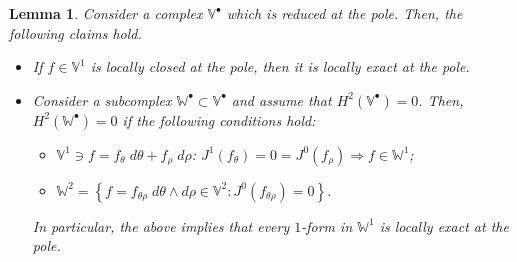 \documentclass[10pt]{article}
\newcommand{\vSpace}[1]{\mathbb{#1}}
\newcommand{\complex}[1]{\mathit{\vSpace{#1}^\bullet}}
\newcommand{\cU}{\theta}
\newcommand{\cV}{\rho}
\newcommand{\dcU}{\mathit{d\cU}}
\newcommand{\dcV}{\mathit{d\cV}}
\newcommand{\jet}[2]{J^{#1}\left(#2\right)}
\theoremstyle{plain}
\newtheorem{lemma}{Lemma}[section]
\theoremstyle{definition}
\theoremstyle{remark}
\begin{document}
\begin{lemma}\label{lem:reduced-complex}
    Consider a complex $\complex{V}$ which is reduced at the pole.
    Then, the following claims hold.
    \begin{itemize}
        \item If $f \in \vSpace{V}^1$ is locally closed at the pole, then it is locally exact at the pole.
        \item Consider a subcomplex $\complex{W} \subset \complex{V}$ and assume that $H^2(\complex{V}) = 0$. Then, $H^2(\complex{W}) = 0$ if the following conditions hold:
        \begin{itemize}
            \item $\vSpace{V}^1 \ni f = f_\cU\;\dcU + f_\cV\;\dcV$: $\jet{1}{f_\cU} = 0 = \jet{0}{f_\cV} \Longrightarrow f \in \vSpace{W}^1$;
            \item $\vSpace{W}^2 = \left\{f = f_{\cU\cV}\;\dcU\wedge\dcV \in \vSpace{V}^2 : \jet{0}{f_{\cU\cV}} = 0\right\}$.
        \end{itemize}
        In particular, the above implies that every $1$-form in $\vSpace{W}^1$ is locally exact at the pole.
    \end{itemize}
\end{lemma}
\end{document}
